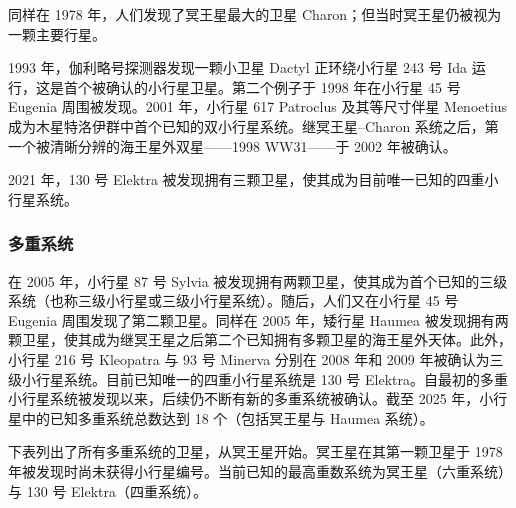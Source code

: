 同样在 1978 年，人们发现了冥王星最大的卫星 Charon；但当时冥王星仍被视为一颗主要行星。

1993 年，伽利略号探测器发现一颗小卫星 Dactyl 正环绕小行星 243 号 Ida 运行，这是首个被确认的小行星卫星。第二个例子于 1998 年在小行星 45 号 Eugenia 周围被发现。2001 年，小行星 617 Patroclus 及其等尺寸伴星 Menoetius 成为木星特洛伊群中首个已知的双小行星系统。继冥王星–Charon 系统之后，第一个被清晰分辨的海王星外双星——1998 WW31——于 2002 年被确认。

2021 年，130 号 Elektra 被发现拥有三颗卫星，使其成为目前唯一已知的四重小行星系统。
\subsubsection{多重系统}
在 2005 年，小行星 87 号 Sylvia 被发现拥有两颗卫星，使其成为首个已知的三级系统（也称三级小行星或三级小行星系统）。随后，人们又在小行星 45 号 Eugenia 周围发现了第二颗卫星。同样在 2005 年，矮行星 Haumea 被发现拥有两颗卫星，使其成为继冥王星之后第二个已知拥有多颗卫星的海王星外天体。此外，小行星 216 号 Kleopatra 与 93 号 Minerva 分别在 2008 年和 2009 年被确认为三级小行星系统。目前已知唯一的四重小行星系统是 130 号 Elektra。自最初的多重小行星系统被发现以来，后续仍不断有新的多重系统被确认。截至 2025 年，小行星中的已知多重系统总数达到 18 个（包括冥王星与 Haumea 系统）。

下表列出了所有多重系统的卫星，从冥王星开始。冥王星在其第一颗卫星于 1978 年被发现时尚未获得小行星编号。当前已知的最高重数系统为冥王星（六重系统）与 130 号 Elektra（四重系统）。
